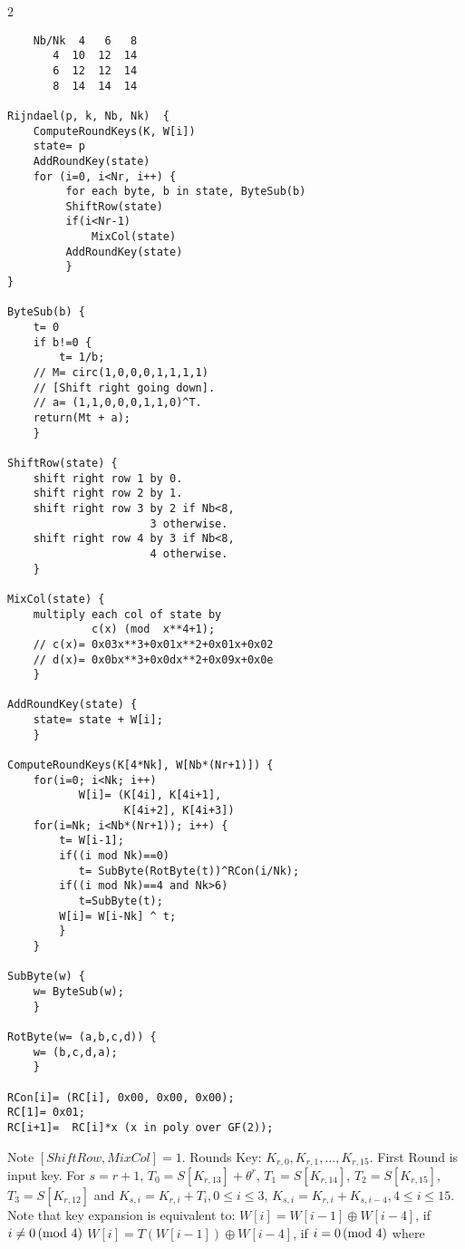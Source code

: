 \begin{multicols} {2} {
\begin{verbatim}
    Nb/Nk  4   6   8
       4  10  12  14 
       6  12  12  14 
       8  14  14  14 

Rijndael(p, k, Nb, Nk)  {
    ComputeRoundKeys(K, W[i])
    state= p 
    AddRoundKey(state)
    for (i=0, i<Nr, i++) {
         for each byte, b in state, ByteSub(b)
         ShiftRow(state)
         if(i<Nr-1) 
             MixCol(state)
         AddRoundKey(state)
         }
}

ByteSub(b) {
    t= 0 
    if b!=0 {
        t= 1/b;
    // M= circ(1,0,0,0,1,1,1,1) 
    // [Shift right going down].
    // a= (1,1,0,0,0,1,1,0)^T.
    return(Mt + a);
    }

ShiftRow(state) {
    shift right row 1 by 0. 
    shift right row 2 by 1. 
    shift right row 3 by 2 if Nb<8, 
                      3 otherwise. 
    shift right row 4 by 3 if Nb<8, 
                      4 otherwise. 
    }

MixCol(state) {
    multiply each col of state by 
             c(x) (mod  x**4+1);
    // c(x)= 0x03x**3+0x01x**2+0x01x+0x02
    // d(x)= 0x0bx**3+0x0dx**2+0x09x+0x0e
    }

AddRoundKey(state) {
    state= state + W[i];
    }

ComputeRoundKeys(K[4*Nk], W[Nb*(Nr+1)]) {
    for(i=0; i<Nk; i++) 
           W[i]= (K[4i], K[4i+1], 
                  K[4i+2], K[4i+3])
    for(i=Nk; i<Nb*(Nr+1)); i++) {
        t= W[i-1];
        if((i mod Nk)==0)
           t= SubByte(RotByte(t))^RCon(i/Nk);
        if((i mod Nk)==4 and Nk>6)
           t=SubByte(t);
        W[i]= W[i-Nk] ^ t;
        }
    }

SubByte(w) {
    w= ByteSub(w);
    }

RotByte(w= (a,b,c,d)) {
    w= (b,c,d,a);
    }

RCon[i]= (RC[i], 0x00, 0x00, 0x00);
RC[1]= 0x01;
RC[i+1]=  RC[i]*x (x in poly over GF(2));
\end{verbatim}
}
\end{multicols}
Note $[ShiftRow, MixCol]=1$.  Rounds Key: $ K_{r,0}, K_{r,1}, \ldots , K_{r,15}$.
First Round is input key.  For $s= r+1$, 
$T_0 = S[K_{r,13}] + \theta^r$,
$T_1 = S[K_{r,14}]$,
$T_2 = S[K_{r,15}]$,
$T_3 = S[K_{r,12}]$ and 
$K_{s,i}= K_{r,i}+T_i, 0 \le i \le 3$, 
$K_{s,i}= K_{r,i}+K_{s, i-4}, 4 \le i \le 15$.  Note that key expansion is
equivalent to: 
$W[i]= W[i-1] \oplus W[i-4]$, if $i \ne 0 \thinspace \textnormal{(mod } 4 \textnormal{)}$
$W[i]= T(W[i-1]) \oplus W[i-4]$, if $i = 0 \thinspace \textnormal{(mod } 4 \textnormal{)}$ where
